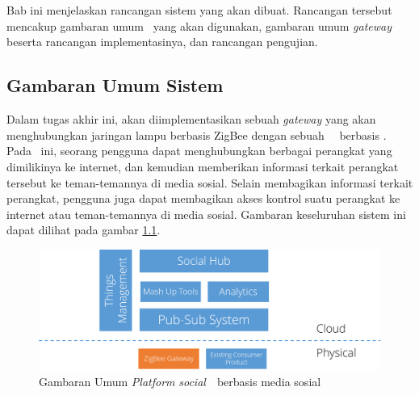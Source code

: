 \chapter{\babTiga}
Bab ini menjelaskan rancangan sistem yang akan dibuat. Rancangan tersebut mencakup gambaran umum \plat~yang akan digunakan, gambaran umum \textit{gateway} beserta rancangan implementasinya, dan rancangan pengujian.

\section{Gambaran Umum Sistem}
Dalam tugas akhir ini, akan diimplementasikan sebuah \textit{gateway} yang akan menghubungkan jaringan lampu berbasis ZigBee dengan sebuah \plat~\iot~berbasis . Pada \plat~ini, seorang pengguna dapat menghubungkan berbagai perangkat  yang dimilikinya ke internet, dan kemudian memberikan informasi terkait perangkat tersebut ke teman-temannya di media sosial. Selain membagikan informasi terkait perangkat, pengguna juga dapat membagikan akses kontrol suatu perangkat ke internet atau teman-temannya di media sosial. Gambaran keseluruhan sistem ini dapat dilihat pada gambar \ref{fig:rancangan-siot}.

\begin{figure}
	\centering
	\includegraphics[width=.9\textwidth]{pics/rancangan-siot.PNG}
	\caption{Gambaran Umum \textit{Platform} \textit{social}~\IOT~berbasis media sosial}
	\label{fig:rancangan-siot}
\end{figure}

